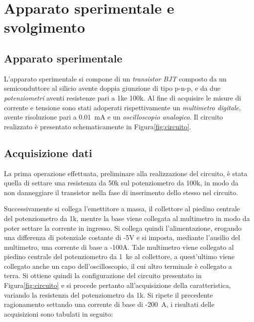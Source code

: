 \documentclass[../main.tex]{subfiles}
\begin{document}
    \section{Apparato sperimentale e svolgimento} \label{sec:acquisizione}

    \subsection{Apparato sperimentale}\label{subsec:apparato-sperimentale}

    L'apparato sperimentale si compone di un \textit{transistor BJT} composto da un
    semiconduttore al silicio avente doppia giunzione di tipo p-n-p, e da due
    \textit{potenziometri} aventi resistenze pari a 1k\textohm e 100k\textohm. Al fine di acquisire
    le misure di corrente e tensione sono stati adoperati rispettivamente un \textit{multimetro digitale},
    avente risoluzione pari a 0.01~mA e un \textit{oscilloscopio analogico}.
    Il circuito realizzato è presentato schematicamente in Figura\ref{fig:circuito}.

    \begin{figure}[h!]
        \centering
        
    \end{figure}
    \newpage
    \subsection{Acquisizione dati}\label{subsec:acquisizione-dati}

    La prima operazione effettuata, preliminare alla realizzazione
    del circuito, è stata quella di settare una resistenza da 50k\textohm
    sul potenziometro da 100k\textohm, in modo da non danneggiare il
    transistor nella fase di inserimento dello stesso nel circuito.

    Successivamente si collega l'emettitore a massa, il collettore al piedino centrale
    del potenziometro da 1k\textohm, mentre la base viene collegata al multimetro
    in modo da poter settare la corrente in ingresso. Si collega quindi
    l'alimentazione, erogando una differenza di potenziale costante di -5V e
    si imposta, mediante l'ausilio del multimetro, una corrente di base
    a -100\textmu A. Tale multimetro viene collegato al piedino
    centrale del potenziometro da 1~k\textohm e al collettore, a quest'ultimo
    viene collegato anche un capo dell'oscilloscopio, il cui altro terminale è collegato a terra.
    Si ottiene quindi la configurazione del circuito presentato in Figura\ref{fig:circuito} e si procede
    pertanto all'acquisizione della caratteristica, variando la
    resistenza del potenziometro da 1k\textohm.
    Si ripete il precedente ragionamento settando una corrente di base
    di -200~\textmu A, i risultati delle acquisizioni sono tabulati in seguito:
\end{document}
